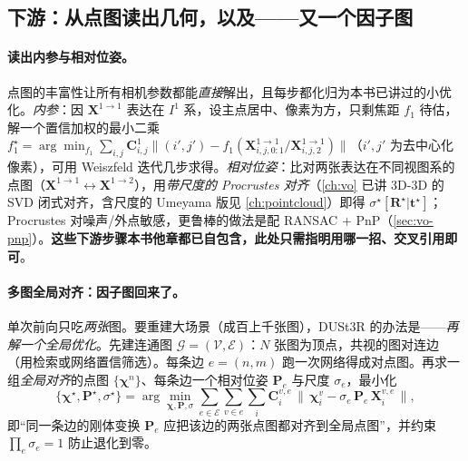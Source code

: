 \subsection{下游：从点图读出几何，以及——又一个因子图}
\label{sec:learning-pointmap-down}

\paragraph{读出内参与相对位姿。}
点图的丰富性让所有相机参数都能\emph{直接}解出，且每步都化归为本书已讲过的小优化\cite{wang2024dust3r}。\emph{内参}：因 $\mathbf{X}^{1\to1}$ 表达在 $I^1$ 系，设主点居中、像素为方，只剩焦距 $f_1$ 待估，解一个置信加权的最小二乘 $f_1^\star=\arg\min_{f_1}\sum_{i,j}\mathbf{C}^1_{i,j}\big\|(i',j')-f_1(\mathbf{X}^{1\to1}_{i,j,0:1}/\mathbf{X}^{1\to1}_{i,j,2})\big\|$（$i',j'$ 为去中心化像素），可用 Weiszfeld 迭代几步求得。\emph{相对位姿}：比对两张表达在不同视图系的点图（$\mathbf{X}^{1\to1}\!\leftrightarrow\!\mathbf{X}^{1\to2}$），用\emph{带尺度的 Procrustes 对齐}（\cref{ch:vo} 已讲 3D-3D 的 SVD 闭式对齐，含尺度的 Umeyama 版见 \cref{ch:pointcloud}）即得 $\sigma^\star[\mathbf{R}^\star|\mathbf{t}^\star]$；Procrustes 对噪声/外点敏感，更鲁棒的做法是配 RANSAC $+$ PnP（\cref{sec:vo-pnp}）。\textbf{这些下游步骤本书他章都已自包含，此处只需指明用哪一招、交叉引用即可}。

\paragraph{多图全局对齐：因子图回来了。}
单次前向只吃\emph{两张}图。要重建大场景（成百上千张图），DUSt3R 的办法是——\emph{再解一个全局优化}\cite{wang2024dust3r}。先建连通图 $\mathcal{G}=(\mathcal V,\mathcal E)$：$N$ 张图为顶点，共视的图对连边（用检索或网络置信筛选）。每条边 $e=(n,m)$ 跑一次网络得成对点图。再求一组\emph{全局对齐}的点图 $\{\boldsymbol\chi^n\}$、每条边一个相对位姿 $\mathbf{P}_e$ 与尺度 $\sigma_e$，最小化
\begin{equation}
  \{\boldsymbol\chi^\star,\mathbf{P}^\star,\sigma^\star\}
  =\arg\min_{\boldsymbol\chi,\mathbf{P},\sigma}
  \sum_{e\in\mathcal{E}}\sum_{v\in e}\sum_{i}
  \mathbf{C}^{v,e}_i\,\big\|\,\boldsymbol\chi^v_i-\sigma_e\,\mathbf{P}_e\,\mathbf{X}^{v,e}_i\,\big\|,
  \label{eq:learn-pointmap-align}
\end{equation}
即“同一条边的刚体变换 $\mathbf{P}_e$ 应把该边的两张点图都对齐到全局点图”，并约束 $\prod_e\sigma_e=1$ 防止退化到零。

